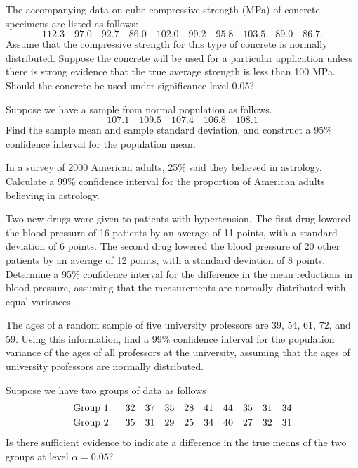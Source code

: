 \begin{problem} The accompanying data on cube compressive strength (MPa) of concrete specimens are listed as follows:
		\[
		112.3  \quad   97.0  \quad  92.7  \quad  86.0  \quad  102.0  \quad  99.2  \quad  95.8  \quad  103.5  \quad  89.0  \quad  86.7.
		\]
		Assume that the compressive strength for this type of concrete is normally distributed. Suppose the concrete will be used for a particular application unless there is strong evidence that the true average strength is less than 100 MPa. Should the concrete be used under significance level 0.05? 		
	\end{problem}

\begin{problem} Suppose we have a sample from normal population as follows.
		\[
		107.1   \quad   109.5   \quad   107.4   \quad  106.8   \quad  108.1
		\]
		Find the sample mean and sample standard deviation, and construct a 95\% confidence interval for the population mean.	
	\end{problem}

\begin{problem} In a survey of 2000 American adults, 25\% said they believed in astrology. Calculate a 99\% confidence interval for the proportion of American adults believing in astrology.
	\end{problem}

\begin{problem} Two new drugs were given to patients with hypertension. The first drug lowered the blood pressure of 16 patients by an average of 11 points, with a standard deviation of 6 points. The second drug lowered the blood pressure of 20 other patients by an average of 12 points, with a standard deviation of 8 points. Determine a 95\% confidence interval for the difference in the mean reductions in blood pressure, assuming that the measurements are normally distributed with equal variances.
	\end{problem}

\begin{problem} The ages of a random sample of five university professors are 39, 54, 61, 72, and 59. Using this
		information, find a 99\% confidence interval for the population variance of the ages of all professors at the university, assuming that the ages of university professors are normally distributed.
	\end{problem}

\begin{problem} Suppose we have two groups of data as follows
		\begin{equation*}
			\begin{split}
				\text{\rm Group 1: }\quad   &32 \quad 37 \quad 35 \quad 28 \quad 41 \quad 44 \quad 35 \quad 31 \quad 34\\
				\text{\rm Group 2: }  \quad &35 \quad 31 \quad 29 \quad 25 \quad 34 \quad 40 \quad 27 \quad 32 \quad 31\\
			\end{split}
		\end{equation*}
	Is there sufficient evidence to indicate a difference in the true means of the two groups at level $\alpha=0.05$?
	\end{problem}

